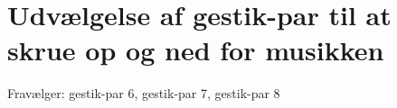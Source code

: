\section{Udvælgelse af gestik-par til at skrue op og ned for musikken}
\label{TestresultaterVolumen}
%


Fravælger: gestik-par 6, gestik-par 7, gestik-par 8